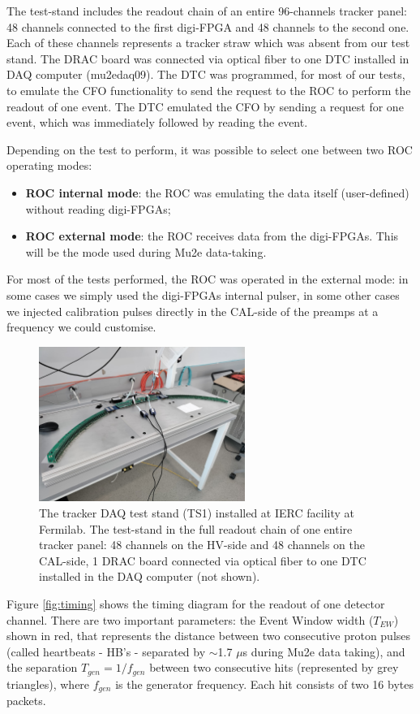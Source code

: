   The test-stand includes the readout chain of an entire 96-channels tracker panel:  
  48 channels connected to the first digi-FPGA and 48 channels to the second one. 
  Each of these channels represents a tracker straw which was absent from our test stand.
  The DRAC board was connected via optical fiber to one DTC installed in DAQ computer (mu2edaq09).
  The DTC was programmed, for most of our tests, to emulate the CFO 
  functionality to send the request to the ROC to perform the readout of one event.
    The DTC emulated the CFO by sending a request 
    for one event, which was immediately followed by reading the event.


    Depending on the test to perform, it was possible to select one 
    between two ROC operating modes:
    \begin{itemize}
    \item  \textbf{ROC internal mode}: the ROC was emulating the data 
    itself (user-defined) without reading digi-FPGAs;
    \item  \textbf{ROC external mode}: the ROC receives data 
    from the digi-FPGAs. This will be the mode used during Mu2e data-taking.
    \end{itemize}
    For most of the tests performed, the ROC was operated 
    in the external mode: in some cases we simply used the 
    digi-FPGAs internal pulser, in some other cases we injected 
    calibration pulses directly in the CAL-side of the preamps at 
    a frequency we could customise.
    \begin{figure}[!h]
        \centering
        \includegraphics[width =0.6\textwidth]{figures/jpg/IMG_20240219_090538.jpg}
        \caption{The tracker DAQ test stand (TS1) installed at IERC facility 
        at Fermilab. The test-stand in the full readout chain 
        of one entire tracker panel: 48 channels on the HV-side 
        and 48 channels on the CAL-side, 1 DRAC board connected 
        via optical fiber to one DTC installed in the DAQ computer 
        (not shown).}
        \label{fig:TS1}
        \end{figure}
    Figure \ref{fig:timing} shows the timing diagram 
    for the readout of one detector channel.
    There are two important parameters: 
    the Event Window width ($T_{EW}$) shown in red, 
    that represents the distance between two consecutive 
    proton pulses (called heartbeats - HB's - separated by 
    $\sim$1.7 $\mu$s during Mu2e data taking), and 
    the separation $T_{gen}=1/f_{gen}$ between 
    two consecutive hits (represented by grey triangles), 
    where $f_{gen}$ is the generator frequency. 
    Each hit consists of two 16 bytes packets.

